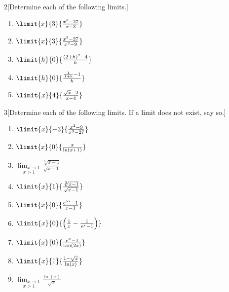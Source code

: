 \begin{ProblemSection}
  \begin{embeddedproblem}{}
    \begin{multicols}{2}[Determine each of the following limits.]
      \begin{enumerate}[label={\bf{}(\alph*)}]
      \item $\limit{x}{3}{\frac{x^3-27}{x-3}}$
      \item $\limit{x}{3}{\frac{x^3-27}{x^2-9}}$
      \item $\limit{h}{0}{\frac{(2+h)^2-4}{h}}$
      \item $\limit{h}{0}{\frac{\frac{1}{1+h}-1}{h}}$
      \item $\limit{x}{4}{\frac{\sqrt{x}-2}{x-4}}$
      \end{enumerate}
    \end{multicols}
  \end{embeddedproblem}
\end{ProblemSection}

\begin{ProblemSection}
  \begin{embeddedproblem}{}
    \begin{multicols}{3}[Determine each of the following limits. If a
      limit does not exist, say so.]
      \begin{enumerate}[label={\bf{}(\alph*)}]
      \item $\limit{x}{-3}{\frac{x^2-9}{x^3-27}}$
      \item $\limit{x}{0}{\frac{x}{\ln(x+1)}}$
      \item $\displaystyle\underset{x>1}{\lim_{x\rightarrow 1}}\frac{\sqrt[3]{x-1}}{\sqrt{x-1}}$
      \item $\limit{x}{1}{\frac{\sqrt[3]{x-1}}{\sqrt{x-1}}}$
      \item $\limit{x}{0}{\frac{e^{5x}-1}{x-1}}$
      \item $\limit{x}{0}{
          \left(
            \frac1x-\frac{1}{e^x-1}
          \right)}$
      \item $\limit{x}{0}{\frac{e^x-1}{\tan(2x)}}$
      \item $\limit{x}{1}{\frac{1-\sqrt{x}}{\ln(x)}}$
      \item $\displaystyle\underset{x>1}{\lim_{x\rightarrow 1}}\frac{\ln(x)}{\sqrt{x}}$
      \end{enumerate}
    \end{multicols}
  \end{embeddedproblem}
\end{ProblemSection}


